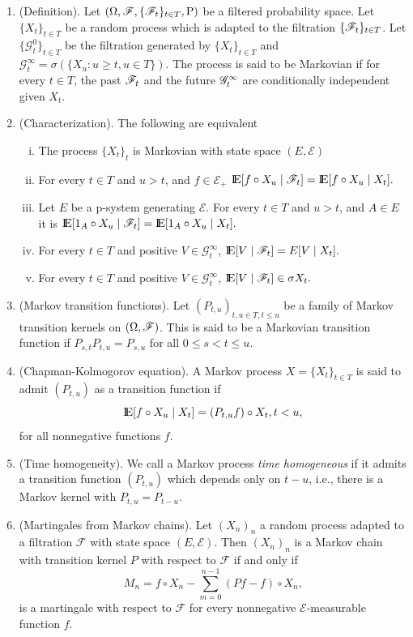 \documentclass[a4paper,10pt]{scrbook}
\begin{document}
\begin{enumerate}
 \item (Definition). Let $(\Omega, \mathscr{F}, \{\mathscr{F}_t\}_{t\in T}, \mathrm{P})$ be a filtered probability space.
       Let $\{X_t\}_{t\in T}$ be a random process which is adapted to the filtration $\{\mathscr{F}_t\}_{t\in T}$.
       Let $\{\mathcal{G}^0_t\}_{t\in T}$ be the filtration generated by $\{X_t\}_{t\in T}$ and 
       $\mathcal{G}^\infty_t = \sigma(\{X_u: u\geq t, u\in T\})$. The process is said to be
       Markovian if for every $t\in T$, the past $\mathscr{F}_t$ and the future $\mathscr{G}^\infty_t$ are conditionally
       independent given $X_t$.
 \item (Characterization). The following are equivalent
       \begin{enumerate}[i.]
        \item The process $\{X_t\}_t$ is Markovian with state space $(E, \mathcal{E})$
        \item For every $t\in T$ and $u>t$, and $f\in\mathcal{E}_+$
           $
             \E[f\circ X_u\mid \F_t] = \E[f\circ X_u\mid X_t].
           $
        \item Let $E$ be a p-system generating $\mathcal{E}$.
              For every $t\in T$ and $u>t$, and $A\in E$ it is
              $
                \E[1_A\circ X_u\mid \F_t] = \E[1_A\circ X_u\mid X_t].
              $
        \item For every $t\in T$ and positive $V\in \mathcal{G}^\infty_t$,
           $
             \E[V\mid \F_t] = E[V\mid X_t].
           $
        \item For every $t\in T$ and positive $V\in \mathcal{G}^\infty_t$,
           $
             \E[V\mid \F_t] \in \sigma X_t.
           $
       \end{enumerate}
  \item (Markov transition functions). Let $(P_{t,u})_{t,u\in T, t\leq u}$ be a family of Markov transition kernels on $(\Omega, \mathscr{F})$. This is said to be a Markovian transition function if $P_{s,t}P_{t,u} = P_{s,u}$ for all $0\leq s < t \leq u$.
  \item (Chapman-Kolmogorov equation). A Markov process $X=\{X_t\}_{t\in T}$ is said to admit $(P_{t,u})$ as a transition function if 
  \[
   \E[f\circ X_u \mid X_t] = (P_{t,u}f)\circ X_t, t<u,
  \]
  for all nonnegative functions $f$.
  \item (Time homogeneity). We call a Markov process \textit{time homogeneous} if it admits a transition function $(P_{t,u})$ which depends only on $t-u$, i.e., there is a Markov kernel with $P_{t,u}=P_{t-u}$.
   
 \item (Martingales from Markov chains). Let \((X_n)_n\) a random process adapted to a 
       filtration \(\mathscr{F}\) with state space \((E, \mathcal{E})\). Then \((X_n)_n\) is a Markov chain with transition 
       kernel \(P\) with respect to \(\mathscr{F}\) if and only if 
       \[
        M_n = f\circ X_n - \sum_{m=0}^{n-1}(Pf - f)\circ X_n,
       \]
       is a martingale with respect to \(\mathscr{F}\) for every nonnegative \(\mathcal{E}\)-measurable
       function \(f\).
\end{enumerate}
\end{document}
